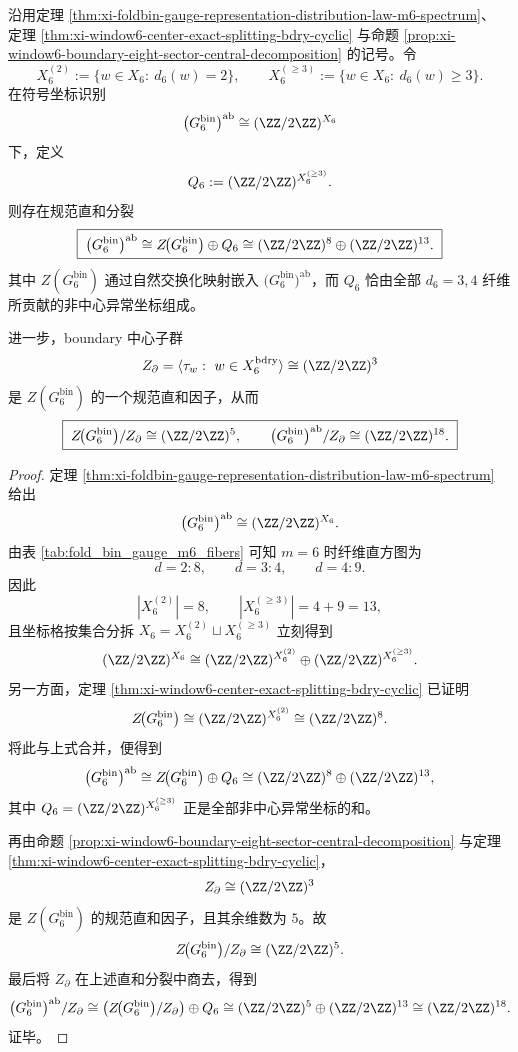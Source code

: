 \begin{theorem}\label{thm:xi-window6-central-noncentral-anomaly-splitting}
沿用定理 \ref{thm:xi-foldbin-gauge-representation-distribution-law-m6-spectrum}、
定理 \ref{thm:xi-window6-center-exact-splitting-bdry-cyclic}
与命题 \ref{prop:xi-window6-boundary-eight-sector-central-decomposition} 的记号。令
\[
X_6^{(2)}:=\{w\in X_6:\ d_6(w)=2\},
\qquad
X_6^{(\ge 3)}:=\{w\in X_6:\ d_6(w)\ge 3\}.
\]
在符号坐标识别
\[
\bigl(G_6^{\mathrm{bin}}\bigr)^{\mathrm{ab}}
\cong
(\ZZ/2\ZZ)^{X_6}
\]
下，定义
\[
Q_6:= (\ZZ/2\ZZ)^{X_6^{(\ge 3)}}.
\]
则存在规范直和分裂
\[
\boxed{\;
\bigl(G_6^{\mathrm{bin}}\bigr)^{\mathrm{ab}}
\cong
Z\!\bigl(G_6^{\mathrm{bin}}\bigr)\oplus Q_6
\cong
(\ZZ/2\ZZ)^8\oplus (\ZZ/2\ZZ)^{13}.\;}
\]
其中 \(Z(G_6^{\mathrm{bin}})\) 通过自然交换化映射嵌入 \(\bigl(G_6^{\mathrm{bin}}\bigr)^{\mathrm{ab}}\)，而 \(Q_6\) 恰由全部 \(d_6=3,4\) 纤维所贡献的非中心异常坐标组成。
\par
进一步，boundary 中心子群
\[
Z_{\partial}
=
\langle \tau_w:\ w\in X_6^{\mathrm{bdry}}\rangle
\cong
(\ZZ/2\ZZ)^3
\]
是 \(Z(G_6^{\mathrm{bin}})\) 的一个规范直和因子，从而
\[
\boxed{\;
Z\!\bigl(G_6^{\mathrm{bin}}\bigr)/Z_{\partial}
\cong
(\ZZ/2\ZZ)^5,
\qquad
\bigl(G_6^{\mathrm{bin}}\bigr)^{\mathrm{ab}}/Z_{\partial}
\cong
(\ZZ/2\ZZ)^{18}.\;}
\]
\end{theorem}
\begin{proof}
定理 \ref{thm:xi-foldbin-gauge-representation-distribution-law-m6-spectrum} 给出
\[
\bigl(G_6^{\mathrm{bin}}\bigr)^{\mathrm{ab}}
\cong
(\ZZ/2\ZZ)^{X_6}.
\]
由表 \ref{tab:fold_bin_gauge_m6_fibers} 可知 \(m=6\) 时纤维直方图为
\[
d=2:8,\qquad d=3:4,\qquad d=4:9.
\]
因此
\[
|X_6^{(2)}|=8,
\qquad
|X_6^{(\ge 3)}|=4+9=13,
\]
且坐标格按集合分拆 \(X_6=X_6^{(2)}\sqcup X_6^{(\ge 3)}\) 立刻得到
\[
(\ZZ/2\ZZ)^{X_6}
\cong
(\ZZ/2\ZZ)^{X_6^{(2)}}
\oplus
(\ZZ/2\ZZ)^{X_6^{(\ge 3)}}.
\]
另一方面，定理 \ref{thm:xi-window6-center-exact-splitting-bdry-cyclic} 已证明
\[
Z\!\bigl(G_6^{\mathrm{bin}}\bigr)
\cong
(\ZZ/2\ZZ)^{X_6^{(2)}}
\cong
(\ZZ/2\ZZ)^8.
\]
将此与上式合并，便得到
\[
\bigl(G_6^{\mathrm{bin}}\bigr)^{\mathrm{ab}}
\cong
Z\!\bigl(G_6^{\mathrm{bin}}\bigr)\oplus Q_6
\cong
(\ZZ/2\ZZ)^8\oplus(\ZZ/2\ZZ)^{13},
\]
其中 \(Q_6=(\ZZ/2\ZZ)^{X_6^{(\ge 3)}}\) 正是全部非中心异常坐标的和。
\par
再由命题 \ref{prop:xi-window6-boundary-eight-sector-central-decomposition} 与定理 \ref{thm:xi-window6-center-exact-splitting-bdry-cyclic}，
\[
Z_{\partial}\cong (\ZZ/2\ZZ)^3
\]
是 \(Z(G_6^{\mathrm{bin}})\) 的规范直和因子，且其余维数为 \(5\)。故
\[
Z\!\bigl(G_6^{\mathrm{bin}}\bigr)/Z_{\partial}\cong (\ZZ/2\ZZ)^5.
\]
最后将 \(Z_{\partial}\) 在上述直和分裂中商去，得到
\[
\bigl(G_6^{\mathrm{bin}}\bigr)^{\mathrm{ab}}/Z_{\partial}
\cong
\left(Z\!\bigl(G_6^{\mathrm{bin}}\bigr)/Z_{\partial}\right)\oplus Q_6
\cong
(\ZZ/2\ZZ)^5\oplus(\ZZ/2\ZZ)^{13}
\cong
(\ZZ/2\ZZ)^{18}.
\]
证毕。
\end{proof}



\endinput

